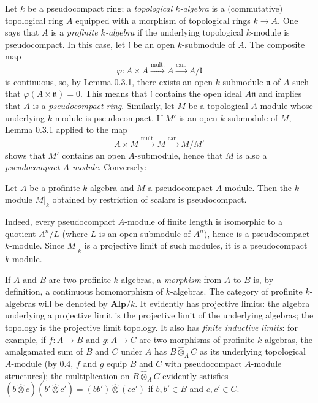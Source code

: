 Let $k$ be a pseudocompact ring; a \emph{topological $k$-algebra} is a (commutative) topological ring $A$ equipped with a morphism of topological rings $k\to A$. One says that $A$ is a \emph{profinite $k$-algebra} if the underlying topological $k$-module is pseudocompact.
In this case, let $\mathfrak l$ be an open $k$-submodule of $A$. The composite map
\[
\varphi:A\times A\xrightarrow{\mathrm{mult.}}A\xrightarrow{\mathrm{can.}}A/\mathfrak l
\]
is continuous, so, by Lemma 0.3.1, there exists an open $k$-submodule $\mathfrak n$ of $A$ such that $\varphi(A\times\mathfrak n)=0$. This means that $\mathfrak l$ contains the open ideal $A\mathfrak n$ and implies that $A$ is a \emph{pseudocompact ring}.
Similarly, let $M$ be a topological $A$-module whose underlying $k$-module is pseudocompact. If $M'$ is an open $k$-submodule of $M$, Lemma 0.3.1 applied to the map
\[
A\times M\xrightarrow{\mathrm{mult.}}M\xrightarrow{\mathrm{can.}}M/M'
\]
shows that $M'$ contains an open $A$-submodule, hence that $M$ is also a \emph{pseudocompact $A$-module}. Conversely:
\begin{lemma}{}
Let $A$ be a profinite $k$-algebra and $M$ a pseudocompact $A$-module. Then the $k$-module $M|_k$ obtained by restriction of scalars is pseudocompact.
\end{lemma}
Indeed, every pseudocompact $A$-module of finite length is isomorphic to a quotient $A^n/L$ (where $L$ is an open submodule of $A^n$), hence is a pseudocompact $k$-module. Since $M|_k$ is a projective limit of such modules, it is a pseudocompact $k$-module.

If $A$ and $B$ are two profinite $k$-algebras, a \emph{morphism} from $A$ to $B$ is, by definition, a continuous homomorphism of $k$-algebras. The category of profinite $k$-algebras will be denoted by $\mathbf{Alp}/k$.
It evidently has projective limits: the algebra underlying a projective limit is the projective limit of the underlying algebras; the topology is the projective limit topology.
It also has \emph{finite inductive limits}: for example, if $f:A\to B$ and $g:A\to C$ are two morphisms of profinite $k$-algebras, the amalgamated sum of $B$ and $C$ under $A$ has $B\widehat\otimes_A C$ as its underlying topological $A$-module (by 0.4, $f$ and $g$ equip $B$ and $C$ with pseudocompact $A$-module structures); the multiplication on $B\widehat\otimes_A C$ evidently satisfies $(b\widehat\otimes c)(b'\widehat\otimes c')=(bb')\widehat\otimes(cc')$ if $b,b'\in B$ and $c,c'\in C$.
